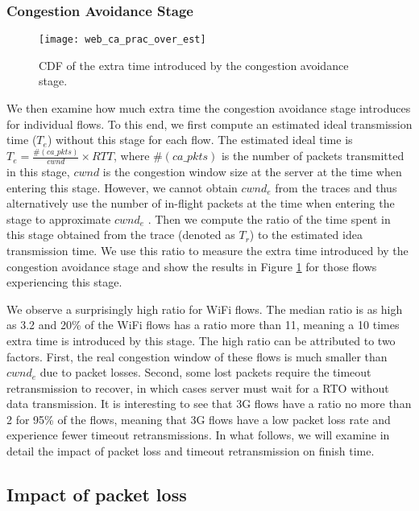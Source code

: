 \subsubsection{Congestion Avoidance Stage}

\begin{figure}[th]
\centering
\texttt{[image: web\_ca\_prac\_over\_est]}
\caption{CDF of the extra time introduced by the congestion avoidance stage.}
\label{fig:web_ca_round}
\end{figure}

We then examine how much extra time the congestion avoidance stage introduces for individual flows. To this end, we first compute an estimated ideal transmission time ($T_e$) without this stage for each flow. The estimated ideal time is $T_e = \frac{\#(ca\_pkts)}{cwnd} \times RTT$, where $\#(ca\_pkts)$ is the number of packets transmitted in this stage, $cwnd$ is the congestion window size at the server at the time when entering this stage. However, we cannot obtain $cwnd_e$ from the traces and thus alternatively use the number of in-flight packets at the time when entering the stage to approximate $cwnd_e$ \cite{rfc56812009tcp}. Then we compute the ratio of the time spent in this stage obtained from the trace (denoted as $T_r$) to the estimated idea transmission time. We use this ratio to measure the extra time introduced by the congestion avoidance stage and show the results in Figure \ref{fig:web_ca_round} for those flows experiencing this stage.

We observe a surprisingly high ratio for WiFi flows. The median ratio is as high as 3.2 and 20\% of the WiFi flows has a ratio more than 11, meaning a 10 times extra time is introduced by this stage. The high ratio can be attributed to two factors. First, the real congestion window of these flows is much smaller than $cwnd_e$ due to packet losses. Second, some lost packets require the timeout retransmission to recover, in which cases server must wait for a RTO without data transmission. It is interesting to see that 3G flows have a ratio no more than 2 for 95\% of the flows, meaning that 3G flows have a low packet loss rate and experience fewer timeout retransmissions. In what follows, we will examine in detail the impact of packet loss and timeout retransmission on finish time. 

\subsection{Impact of packet loss}
\label{sec:web_pkt_loss}

